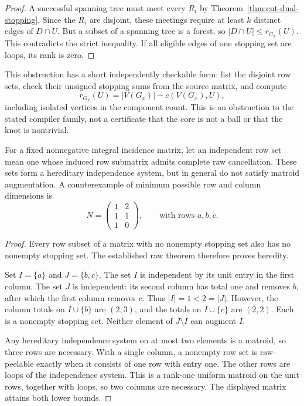 \begin{proof}
A successful spanning tree must meet every $R_i$ by
Theorem~\ref{thm:cut-dual-stopping}.  Since the $R_i$ are disjoint, these
meetings require at least $k$ distinct edges of $D\cap U$.  But a subset
of a spanning tree is a forest, so
$|D\cap U|\le r_{G_x}(U)$.  This contradicts the strict inequality.
If all eligible edges of one stopping set are loops, its rank is zero.
\end{proof}

This obstruction has a short independently checkable form: list the
disjoint row sets, check their unsigned stopping sums from the source
matrix, and compute
\[
 r_{G_x}(U)=|V(G_x)|-c(V(G_x),U),
\]
including isolated vertices in the component count.  This is an
obstruction to the stated compiler family, not a certificate that the
core is not a ball or that the knot is nontrivial.

\begin{proposition}
\label{prop:cut-dual-nonmatroid}
For a fixed nonnegative integral incidence matrix, let an independent
row set mean one whose induced row submatrix admits complete raw
cancellation.  These sets form a hereditary independence system, but
in general do not satisfy matroid augmentation.  A counterexample of
minimum possible row and column dimensions is
\[
 N=\begin{pmatrix}
  1&2\\
  1&1\\
  1&0
 \end{pmatrix},
 \qquad\text{with rows }a,b,c.
\]
\end{proposition}

\begin{proof}
Every row subset of a matrix with no nonempty stopping set also has no
nonempty stopping set.  The established raw theorem therefore proves
heredity.

Set $I=\{a\}$ and $J=\{b,c\}$.  The set $I$ is independent by its unit
entry in the first column.  The set $J$ is independent: its second column
has total one and removes $b$, after which the first column removes $c$.
Thus $|I|=1<2=|J|$.  However, the column totals on $I\cup\{b\}$ are
$(2,3)$, and the totals on $I\cup\{c\}$ are $(2,2)$.  Each is a nonempty
stopping set.  Neither element of $J\setminus I$ can augment $I$.

Any hereditary independence system on at most two elements is a matroid,
so three rows are necessary.  With a single column, a nonempty row set
is raw-peelable exactly when it consists of one row with entry one.
The other rows are loops of the independence system.  This is a rank-one
uniform matroid on the unit rows, together with loops, so two columns
are necessary.  The displayed matrix attains both lower bounds.
\end{proof}


